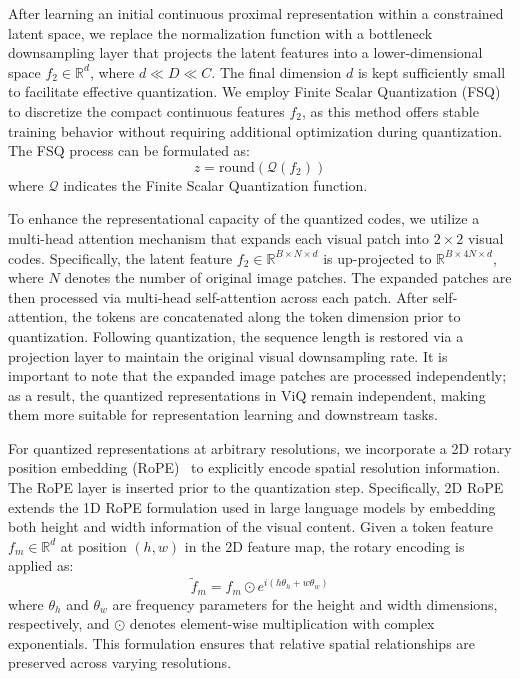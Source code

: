 After learning an initial continuous proximal representation within a constrained latent space, we replace the normalization function with a bottleneck downsampling layer that projects the latent features into a lower-dimensional space \( f_2 \in \mathbb{R}^d \), where \( d \ll D \ll C \). The final dimension \( d \) is kept sufficiently small to facilitate effective quantization. We employ Finite Scalar Quantization (FSQ)~\cite{mentzerfinite} to discretize the compact continuous features \( f_2 \), as this method offers stable training behavior without requiring additional optimization during quantization. The FSQ process can be formulated as:
\begin{equation}
z = \text{round}(\mathcal{Q}(f_2))
\end{equation}
where $\mathcal{Q}$ indicates the Finite Scalar Quantization function.

To enhance the representational capacity of the quantized codes, we utilize a multi-head attention mechanism that expands each visual patch into \( 2 \times 2 \) visual codes. Specifically, the latent feature \( f_2 \in \mathbb{R}^{B \times N \times d} \) is up-projected to \( \mathbb{R}^{B \times 4N \times d} \), where \( N \) denotes the number of original image patches. The expanded patches are then processed via multi-head self-attention across each patch. After self-attention, the tokens are concatenated along the token dimension prior to quantization. Following quantization, the sequence length is restored via a projection layer to maintain the original visual downsampling rate. It is important to note that the expanded image patches are processed independently; as a result, the quantized representations in ViQ remain independent, making them more suitable for representation learning and downstream tasks.

For quantized representations at arbitrary resolutions, we incorporate a 2D rotary position embedding (RoPE)~\cite{su2024roformer} to explicitly encode spatial resolution information. The RoPE layer is inserted prior to the quantization step. Specifically, 2D RoPE extends the 1D RoPE formulation used in large language models by embedding both height and width information of the visual content. Given a token feature \( f_m \in \mathbb{R}^d \) at position \( (h, w) \) in the 2D feature map, the rotary encoding is applied as:
\begin{equation}
\tilde{f}_m = f_m \odot e^{i (h \theta_h + w \theta_w)}
\end{equation}
where \( \theta_h \) and \( \theta_w \) are frequency parameters for the height and width dimensions, respectively, and \( \odot \) denotes element-wise multiplication with complex exponentials. This formulation ensures that relative spatial relationships are preserved across varying resolutions.

